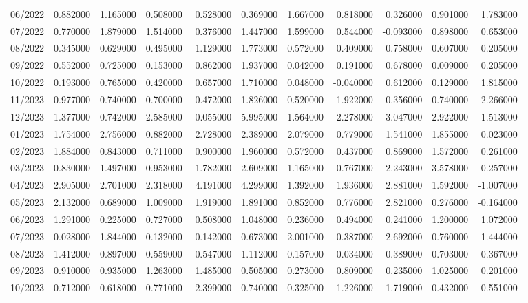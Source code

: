 \begin{tabular}{lrrrrrrrrrr}
06/2022 & 0.882000 & 1.165000 & 0.508000 & 0.528000 & 0.369000 & 1.667000 & 0.818000 & 0.326000 & 0.901000 & 1.783000 \\
07/2022 & 0.770000 & 1.879000 & 1.514000 & 0.376000 & 1.447000 & 1.599000 & 0.544000 & -0.093000 & 0.898000 & 0.653000 \\
08/2022 & 0.345000 & 0.629000 & 0.495000 & 1.129000 & 1.773000 & 0.572000 & 0.409000 & 0.758000 & 0.607000 & 0.205000 \\
09/2022 & 0.552000 & 0.725000 & 0.153000 & 0.862000 & 1.937000 & 0.042000 & 0.191000 & 0.678000 & 0.009000 & 0.205000 \\
10/2022 & 0.193000 & 0.765000 & 0.420000 & 0.657000 & 1.710000 & 0.048000 & -0.040000 & 0.612000 & 0.129000 & 1.815000 \\
11/2023 & 0.977000 & 0.740000 & 0.700000 & -0.472000 & 1.826000 & 0.520000 & 1.922000 & -0.356000 & 0.740000 & 2.266000 \\
12/2023 & 1.377000 & 0.742000 & 2.585000 & -0.055000 & 5.995000 & 1.564000 & 2.278000 & 3.047000 & 2.922000 & 1.513000 \\
01/2023 & 1.754000 & 2.756000 & 0.882000 & 2.728000 & 2.389000 & 2.079000 & 0.779000 & 1.541000 & 1.855000 & 0.023000 \\
02/2023 & 1.884000 & 0.843000 & 0.711000 & 0.900000 & 1.960000 & 0.572000 & 0.437000 & 0.869000 & 1.572000 & 0.261000 \\
03/2023 & 0.830000 & 1.497000 & 0.953000 & 1.782000 & 2.609000 & 1.165000 & 0.767000 & 2.243000 & 3.578000 & 0.257000 \\
04/2023 & 2.905000 & 2.701000 & 2.318000 & 4.191000 & 4.299000 & 1.392000 & 1.936000 & 2.881000 & 1.592000 & -1.007000 \\
05/2023 & 2.132000 & 0.689000 & 1.009000 & 1.919000 & 1.891000 & 0.852000 & 0.776000 & 2.821000 & 0.276000 & -0.164000 \\
06/2023 & 1.291000 & 0.225000 & 0.727000 & 0.508000 & 1.048000 & 0.236000 & 0.494000 & 0.241000 & 1.200000 & 1.072000 \\
07/2023 & 0.028000 & 1.844000 & 0.132000 & 0.142000 & 0.673000 & 2.001000 & 0.387000 & 2.692000 & 0.760000 & 1.444000 \\
08/2023 & 1.412000 & 0.897000 & 0.559000 & 0.547000 & 1.112000 & 0.157000 & -0.034000 & 0.389000 & 0.703000 & 0.367000 \\
09/2023 & 0.910000 & 0.935000 & 1.263000 & 1.485000 & 0.505000 & 0.273000 & 0.809000 & 0.235000 & 1.025000 & 0.201000 \\
10/2023 & 0.712000 & 0.618000 & 0.771000 & 2.399000 & 0.740000 & 0.325000 & 1.226000 & 1.719000 & 0.432000 & 0.551000 \\

\end{tabular}
